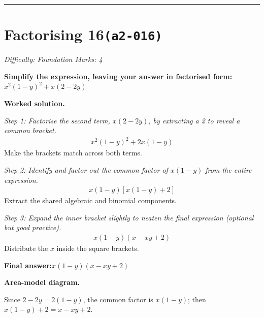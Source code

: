 \documentclass[11pt]{article}
\newcommand{\question}[1]{\par\medskip\noindent\textbf{#1}\par}
\begin{document}
\medskip\hrule

\section*{Factorising 16\quad\small\texttt{(a2-016)}}
\textit{Difficulty: Foundation \quad\textbar\quad Marks: 4}

\question{Simplify the expression, leaving your answer in factorised form: \( x^2(1-y)^2 + x(2-2y) \)}

\textbf{Worked solution.}

\textit{Step 1: Factorise the second term, \( x(2-2y) \), by extracting a 2 to reveal a common bracket.}
\[\begin{gathered}
x^2(1-y)^2 + 2x(1-y)
\end{gathered}\]
Make the brackets match across both terms.

\textit{Step 2: Identify and factor out the common factor of \( x(1-y) \) from the entire expression.}
\[\begin{gathered}
x(1-y)[x(1-y) + 2]
\end{gathered}\]
Extract the shared algebraic and binomial components.

\textit{Step 3: Expand the inner bracket slightly to neaten the final expression (optional but good practice).}
\[\begin{gathered}
x(1-y)(x - xy + 2)
\end{gathered}\]
Distribute the \( x \) inside the square brackets.

\begin{answerbox}
\textbf{Final answer:}\quad \(\displaystyle x(1-y)(x - xy + 2)\)
\end{answerbox}
\textbf{Area-model diagram.}

\begin{center}
\end{center}
\small Since $2-2y=2(1-y)$, the common factor is $x(1-y)$; then $x(1-y)+2=x-xy+2$.\normalsize
\end{document}
